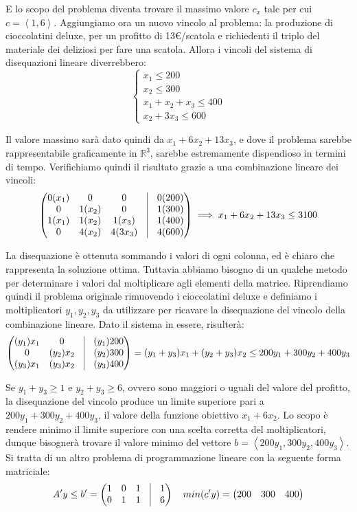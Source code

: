 \noindent E lo scopo del problema diventa trovare il massimo valore $c_x$ tale per cui $c = \left<1, 6\right>$. Aggiungiamo ora un nuovo vincolo al
problema: la produzione di cioccolatini deluxe, per un profitto di 13€/scatola e richiedenti il triplo del materiale dei deliziosi per fare una scatola.
Allora i vincoli del sistema di disequazioni lineare diverrebbero: \[
    \begin{cases}
        x_1\leq 200\\
        x_2\leq 300\\
        x_1+x_2+x_3\leq 400\\
        x_2+3x_3\leq 600
    \end{cases}
\]

\noindent Il valore massimo sarà dato quindi da $x_1+6x_2+13x_3$, e dove il problema sarebbe rappresentabile graficamente in $\mathbb{R}^3$, sarebbe
estremamente dispendioso in termini di tempo. Verifichiamo quindi il risultato grazie a una combinazione lineare dei vincoli: \[
    \begin{pmatrix}
        0(x_1) & 0 & 0 & \vline & 0(200)\\
        0 & 1(x_2) & 0 & \vline & 1(300)\\
        1(x_1) & 1(x_2) & 1(x_3) & \vline & 1(400)\\
        0 & 4(x_2) & 4(3x_3) & \vline & 4(600)
    \end{pmatrix} \implies x_1 + 6x_2 + 13x_3 \leq 3100
\]

\noindent La disequazione è ottenuta sommando i valori di ogni colonna, ed è chiaro che rappresenta la soluzione ottima. Tuttavia abbiamo bisogno di
un qualche metodo per determinare i valori dal moltiplicare agli elementi della matrice. Riprendiamo quindi il problema originale rimuovendo i
cioccolatini deluxe e definiamo i moltiplicatori $y_1, y_2, y_3$ da utilizzare per ricavare la disequazione del vincolo della combinazione lineare.
Dato il sistema in essere, risulterà: \[
    \begin{pmatrix}
    (y_1)x_1 & 0 & \vline & (y_1)200\\
    0 & (y_2)x_2 & \vline & (y_2)300\\
    (y_3)x_1 & (y_3)x_2 & \vline & (y_3)400 
\end{pmatrix} = (y_1+y_3)x_1 + (y_2+y_3)x_2 \leq 200y_1 + 300y_2 + 400y_3
\]

\noindent Se $y_1+y_3 \geq 1$ e $y_2 + y_3 \geq 6$, ovvero sono maggiori o uguali del valore del profitto, la disequazione del vincolo produce un limite
superiore pari a $200y_1 + 300y_2 + 400y_3$, il valore della funzione obiettivo $x_1+6x_2$. Lo scopo è rendere minimo il limite superiore con una scelta
corretta del moltiplicatori, dunque bisognerà trovare il valore minimo del vettore $b = \left<200y_1, 300y_2, 400y_3\right>$. Si tratta di un altro
problema di programmazione lineare con la seguente forma matriciale: \[
    A'y \leq b' = \begin{pmatrix}
        1 & 0 & 1 & \vline & 1\\
        0 & 1 & 1 & \vline & 6
    \end{pmatrix}\quad min(c'y) = \begin{pmatrix}
        200 & 300 & 400
    \end{pmatrix}
\]

